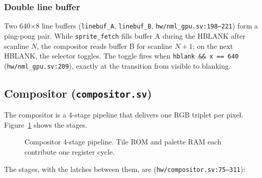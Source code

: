 \documentclass[11pt,letterpaper]{article}
\begin{document}
\subsubsection{Double line buffer}

Two 640$\times$8 line buffers (\texttt{linebuf\_A}, \texttt{linebuf\_B},
\texttt{hw/nml\_gpu.sv:198--221}) form a ping-pong pair. While
\texttt{sprite\_fetch} fills buffer A during the HBLANK after scanline $N$,
the compositor reads buffer B for scanline $N+1$; on the next HBLANK, the
selector toggles. The toggle fires when \texttt{hblank \&\& x == 640}
(\texttt{hw/nml\_gpu.sv:209}), exactly at the transition from visible to
blanking.

\subsection{Compositor (\texttt{compositor.sv})}

The compositor is a 4-stage pipeline that delivers one RGB triplet per
pixel. Figure~\ref{fig:comp} shows the stages.

\begin{figure}[h]
\centering
{}
\caption{Compositor 4-stage pipeline. Tile ROM and palette RAM each contribute one register cycle.}
\label{fig:comp}
\end{figure}

The stages, with the latches between them, are
(\texttt{hw/compositor.sv:75--311}):
\end{document}
